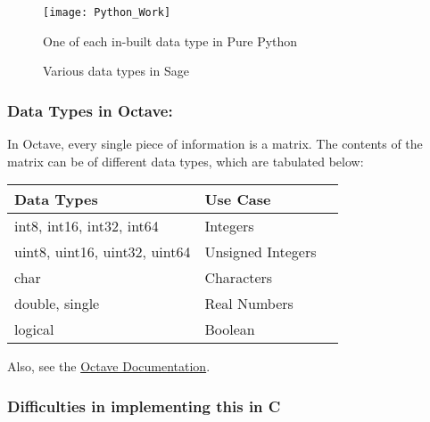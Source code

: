 \documentclass[12pt,a4paper]{article}
\begin{document}
\begin{figure}
	\centering
	\texttt{[image: Python\_Work]}
	\caption{One of each in-built data type in Pure Python}
\end{figure}

\begin{figure}
	\centering
	\caption{Various data types in Sage}
\end{figure}

\pagebreak
\subsubsection{Data Types in Octave:}

In Octave, every single piece of information is a matrix. The contents of the matrix can be of different data types, which are tabulated below:

\begin{tabular}{|l|p{5cm}|p{6cm}}
	\hline
	Data Types & Use Case\\
	\hline
	int8, int16, int32, int64 & Integers\\
	uint8, uint16, uint32, uint64 & Unsigned Integers\\
	char & Characters\\
	double, single & Real Numbers\\
	logical & Boolean\\
	\hline
\end{tabular}

Also, see the \href{https://octave.org/doc/v4.2.0/Built_002din-Data-Types.html#Built_002din-Data-Types} {Octave Documentation}.

\subsubsection{Difficulties in implementing this in C}
\end{document}
